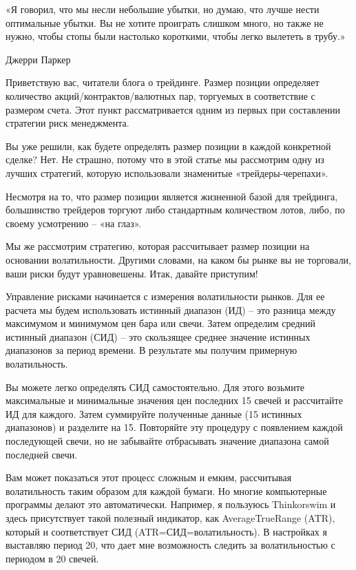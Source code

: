 \documentclass[a5paper]{article}
\begin{document}
    «Я говорил, что мы несли небольшие убытки, но думаю, что лучше нести оптимальные убытки. Вы не хотите проиграть слишком много, но также не нужно, чтобы стопы были настолько короткими, чтобы легко вылететь в трубу.»

    Джерри Паркер

Приветствую вас, читатели блога о трейдинге. Размер позиции определяет количество акций/контрактов/валютных пар, торгуемых в соответствие с размером счета. Этот пункт рассматривается одним из первых при составлении стратегии риск менеджмента.

Вы уже решили, как будете определять размер позиции в каждой конкретной сделке? Нет. Не страшно, потому что в этой статье мы рассмотрим одну из лучших стратегий, которую использовали знаменитые «трейдеры-черепахи».

Несмотря на то, что размер позиции является жизненной базой для трейдинга, большинство трейдеров торгуют либо стандартным количеством лотов, либо, по своему усмотрению – «на глаз».

Мы же рассмотрим стратегию, которая рассчитывает размер позиции на основании волатильности. Другими словами, на каком бы рынке вы не торговали, ваши риски будут уравновешены. Итак, давайте приступим!

Управление рисками начинается с измерения волатильности рынков. Для ее расчета мы будем использовать истинный диапазон (ИД) – это разница между максимумом и минимумом цен бара или свечи. Затем определим средний истинный диапазон (СИД) – это скользящее среднее значение истинных диапазонов за период времени. В результате мы получим примерную волатильность.

Вы можете легко определять СИД самостоятельно. Для этого возьмите максимальные и минимальные значения цен последних 15 свечей и рассчитайте ИД для каждого. Затем суммируйте полученные данные (15 истинных диапазонов) и разделите на 15. Повторяйте эту процедуру с появлением каждой последующей свечи, но не забывайте отбрасывать значение диапазона самой последней свечи.

Вам может показаться этот процесс сложным и емким, рассчитывая волатильность таким образом для каждой бумаги. Но многие компьютерные программы делают это автоматически. Например, я пользуюсь Thinkorswim и здесь присутствует такой полезный индикатор, как AverageTrueRange (ATR), который и соответствует СИД (ATR=СИД=волатильность). В настройках я выставляю период 20, что дает мне возможность следить за волатильностью с периодом в 20 свечей.
\end{document}

